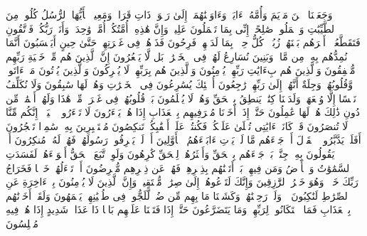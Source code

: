 \stopbuffer%
\startbuffer[\q:23:50]
وَجَعَلۡنَا ٱبۡنَ مَرۡیَمَ وَأُمَّهُۥۤ ءَایَةࣰ وَءَاوَیۡنَٰهُمَاۤ إِلَىٰ رَبۡوَةࣲ ذَاتِ قَرَارࣲ وَمَعِینࣲ%
\stopbuffer%
\startbuffer[\q:23:51]
یَٰۤأَیُّهَا ٱلرُّسُلُ كُلُوا۟ مِنَ ٱلطَّیِّبَٰتِ وَٱعۡمَلُوا۟ صَٰلِحًاۖ إِنِّی بِمَا تَعۡمَلُونَ عَلِیمࣱ%
\stopbuffer%
\startbuffer[\q:23:52]
وَإِنَّ هَٰذِهِۦۤ أُمَّتُكُمۡ أُمَّةࣰ وَٰحِدَةࣰ وَأَنَا۠ رَبُّكُمۡ فَٱتَّقُونِ%
\stopbuffer%
\startbuffer[\q:23:53]
فَتَقَطَّعُوۤا۟ أَمۡرَهُم بَیۡنَهُمۡ زُبُرࣰاۖ كُلُّ حِزۡبِۭ بِمَا لَدَیۡهِمۡ فَرِحُونَ%
\stopbuffer%
\startbuffer[\q:23:54]
فَذَرۡهُمۡ فِی غَمۡرَتِهِمۡ حَتَّىٰ حِینٍ%
\stopbuffer%
\startbuffer[\q:23:55]
أَیَحۡسَبُونَ أَنَّمَا نُمِدُّهُم بِهِۦ مِن مَّالࣲ وَبَنِینَ%
\stopbuffer%
\startbuffer[\q:23:56]
نُسَارِعُ لَهُمۡ فِی ٱلۡخَیۡرَٰتِۚ بَل لَّا یَشۡعُرُونَ%
\stopbuffer%
\startbuffer[\q:23:57]
إِنَّ ٱلَّذِینَ هُم مِّنۡ خَشۡیَةِ رَبِّهِم مُّشۡفِقُونَ%
\stopbuffer%
\startbuffer[\q:23:58]
وَٱلَّذِینَ هُم بِءَایَٰتِ رَبِّهِمۡ یُؤۡمِنُونَ%
\stopbuffer%
\startbuffer[\q:23:59]
وَٱلَّذِینَ هُم بِرَبِّهِمۡ لَا یُشۡرِكُونَ%
\stopbuffer%
\startbuffer[\q:23:60]
وَٱلَّذِینَ یُؤۡتُونَ مَاۤ ءَاتَوا۟ وَّقُلُوبُهُمۡ وَجِلَةٌ أَنَّهُمۡ إِلَىٰ رَبِّهِمۡ رَٰجِعُونَ%
\stopbuffer%
\startbuffer[\q:23:61]
أُو۟لَٰۤئِكَ یُسَٰرِعُونَ فِی ٱلۡخَیۡرَٰتِ وَهُمۡ لَهَا سَٰبِقُونَ%
\stopbuffer%
\startbuffer[\q:23:62]
وَلَا نُكَلِّفُ نَفۡسًا إِلَّا وُسۡعَهَاۚ وَلَدَیۡنَا كِتَٰبࣱ یَنطِقُ بِٱلۡحَقِّ وَهُمۡ لَا یُظۡلَمُونَ%
\stopbuffer%
\startbuffer[\q:23:63]
بَلۡ قُلُوبُهُمۡ فِی غَمۡرَةࣲ مِّنۡ هَٰذَا وَلَهُمۡ أَعۡمَٰلࣱ مِّن دُونِ ذَٰلِكَ هُمۡ لَهَا عَٰمِلُونَ%
\stopbuffer%
\startbuffer[\q:23:64]
حَتَّىٰۤ إِذَاۤ أَخَذۡنَا مُتۡرَفِیهِم بِٱلۡعَذَابِ إِذَا هُمۡ یَجۡءَرُونَ%
\stopbuffer%
\startbuffer[\q:23:65]
لَا تَجۡءَرُوا۟ ٱلۡیَوۡمَۖ إِنَّكُم مِّنَّا لَا تُنصَرُونَ%
\stopbuffer%
\startbuffer[\q:23:66]
قَدۡ كَانَتۡ ءَایَٰتِی تُتۡلَىٰ عَلَیۡكُمۡ فَكُنتُمۡ عَلَىٰۤ أَعۡقَٰبِكُمۡ تَنكِصُونَ%
\stopbuffer%
\startbuffer[\q:23:67]
مُسۡتَكۡبِرِینَ بِهِۦ سَٰمِرࣰا تَهۡجُرُونَ%
\stopbuffer%
\startbuffer[\q:23:68]
أَفَلَمۡ یَدَّبَّرُوا۟ ٱلۡقَوۡلَ أَمۡ جَاۤءَهُم مَّا لَمۡ یَأۡتِ ءَابَاۤءَهُمُ ٱلۡأَوَّلِینَ%
\stopbuffer%
\startbuffer[\q:23:69]
أَمۡ لَمۡ یَعۡرِفُوا۟ رَسُولَهُمۡ فَهُمۡ لَهُۥ مُنكِرُونَ%
\stopbuffer%
\startbuffer[\q:23:70]
أَمۡ یَقُولُونَ بِهِۦ جِنَّةُۢۚ بَلۡ جَاۤءَهُم بِٱلۡحَقِّ وَأَكۡثَرُهُمۡ لِلۡحَقِّ كَٰرِهُونَ%
\stopbuffer%
\startbuffer[\q:23:71]
وَلَوِ ٱتَّبَعَ ٱلۡحَقُّ أَهۡوَاۤءَهُمۡ لَفَسَدَتِ ٱلسَّمَٰوَٰتُ وَٱلۡأَرۡضُ وَمَن فِیهِنَّۚ بَلۡ أَتَیۡنَٰهُم بِذِكۡرِهِمۡ فَهُمۡ عَن ذِكۡرِهِم مُّعۡرِضُونَ%
\stopbuffer%
\startbuffer[\q:23:72]
أَمۡ تَسۡءَلُهُمۡ خَرۡجࣰا فَخَرَاجُ رَبِّكَ خَیۡرࣱۖ وَهُوَ خَیۡرُ ٱلرَّٰزِقِینَ%
\stopbuffer%
\startbuffer[\q:23:73]
وَإِنَّكَ لَتَدۡعُوهُمۡ إِلَىٰ صِرَٰطࣲ مُّسۡتَقِیمࣲ%
\stopbuffer%
\startbuffer[\q:23:74]
وَإِنَّ ٱلَّذِینَ لَا یُؤۡمِنُونَ بِٱلۡءَاخِرَةِ عَنِ ٱلصِّرَٰطِ لَنَٰكِبُونَ%
\stopbuffer%
\startbuffer[\q:23:75]
۞ وَلَوۡ رَحِمۡنَٰهُمۡ وَكَشَفۡنَا مَا بِهِم مِّن ضُرࣲّ لَّلَجُّوا۟ فِی طُغۡیَٰنِهِمۡ یَعۡمَهُونَ%
\stopbuffer%
\startbuffer[\q:23:76]
وَلَقَدۡ أَخَذۡنَٰهُم بِٱلۡعَذَابِ فَمَا ٱسۡتَكَانُوا۟ لِرَبِّهِمۡ وَمَا یَتَضَرَّعُونَ%
\stopbuffer%
\startbuffer[\q:23:77]
حَتَّىٰۤ إِذَا فَتَحۡنَا عَلَیۡهِم بَابࣰا ذَا عَذَابࣲ شَدِیدٍ إِذَا هُمۡ فِیهِ مُبۡلِسُونَ%
\stopbuffer%
